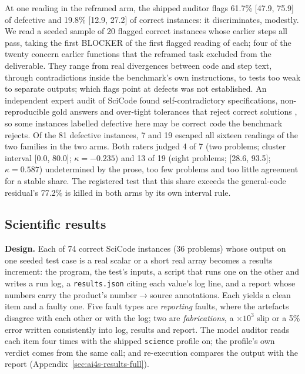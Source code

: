 At one reading in the reframed arm, the shipped auditor flags 61.7\% [47.9, 75.9] of defective and
19.8\% [12.9, 27.2] of correct instances: it discriminates, modestly. We read a seeded sample of 20 flagged correct instances whose earlier steps all pass, taking the first BLOCKER of the first flagged reading of each; four of the twenty concern earlier functions that the reframed task excluded from the deliverable. They range from real divergences between code and step text, through
contradictions inside the benchmark's own instructions, to tests too weak to separate outputs;
which flags point at defects was not established. An independent expert audit of SciCode found
self-contradictory specifications, non-reproducible gold answers and over-tight tolerances that
reject correct solutions \citep{hu2026scicodeverified}, so some instances labelled defective here
may be correct code the benchmark rejects. Of the 81 defective instances, 7 and 19 escaped all
sixteen readings of the two families in the two arms. Both raters judged 4 of 7 (two problems; cluster interval [0.0, 80.0]; $\kappa = -0.235$) and 13 of 19 (eight problems; [28.6, 93.5]; $\kappa = 0.587$) undetermined by the prose, too few problems and too little agreement for a stable share. The registered test that this share exceeds the general-code residual's 77.2\% is killed in both arms by its own interval rule.

\subsection{Scientific results}
\label{sec:ai4s-results}

\textbf{Design.} Each of 74 correct SciCode instances (36 problems) whose output on one seeded test
case is a real scalar or a short real array becomes a results increment: the program, the test's
inputs, a script that runs one on the other and writes a run log, a \texttt{results.json} citing each
value's log line, and a report whose numbers carry the product's number$\to$source annotations. Each
yields a clean item and a faulty one. Five fault types are \emph{reporting} faults, where the
artefacts disagree with each other or with the log; two are \emph{fabrications}, a $\times10^3$ slip
or a 5\% error written consistently into log, results and report. The model auditor reads each item
four times with the shipped \texttt{science} profile on; the profile's own verdict comes from the
same call; and re-execution compares the output with the report (Appendix~\ref{sec:ai4s-results-full}).

